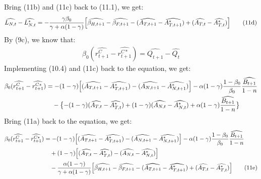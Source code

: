 \documentclass[a4paper,12pt]{article} %
\theoremstyle{nonitalic}
\begin{document}
Bring (11b) and (11c) back to (11.1), we get:
\begin{gather*}
    \widehat{L_{N,t}} - \widehat{L_{N,t}^*} = - \frac{\gamma \beta_0}{\gamma + \alpha(1-\gamma)} \Bigl[ \widehat{\beta_{H,t+1}} - \widehat{\beta_{F,t+1}} - (\widehat{A_{T,t+1}} - \widehat{A_{T,t+1}^*}) + (\widehat{A_{T,t}} - \widehat{A_{T,t}^*}) \Bigr] \tag{11d}
\end{gather*}
By (9c), we know that:
\begin{gather*}
    \beta_0 (\widehat{r_{t+1}^C} - \widehat{r_{t+1}^{C*}}) = \widehat{Q_{t+1}} - \widehat{Q_t}
\end{gather*}
Implementing (10.4) and (11c) back to the equation, we get:
\begin{align*}
    \beta_0 (\widehat{r_{t+1}^C} - \widehat{r_{t+1}^{C*}}) &= -(1-\gamma) \Bigl[ (\widehat{A_{T,t+1}} - \widehat{A_{T,t+1}^*}) - (\widehat{A_{N,t+1}} - \widehat{A_{N,t+1}^*}) \Bigr] - \alpha (1-\gamma) \frac{1-\beta_0}{\beta_0} \frac{\widehat{B_{t+1}}}{1-n} \\
    & \quad - \bigl\{ -(1-\gamma) (\widehat{A_{T,t}} - \widehat{A_{T,t}^*}) + (1-\gamma) (\widehat{A_{N,t}} - \widehat{A_{N,t}^*}) + \alpha (1-\gamma) \frac{\widehat{B_{t+1}}}{1-n} \bigr\}
\end{align*}
Bring (11a) back to the equation, we get:
\begin{align*}
    \beta_0 (\widehat{r_{t+1}^C} - \widehat{r_{t+1}^{C*}}) &= -(1-\gamma) \Bigl[ (\widehat{A_{T,t+1}} - \widehat{A_{T,t+1}^*}) - (\widehat{A_{N,t+1}} - \widehat{A_{N,t+1}^*}) \Bigr] - \alpha (1-\gamma) \frac{1-\beta_0}{\beta_0} \frac{\widehat{B_{t+1}}}{1-n} \\
    & \quad + (1-\gamma) \Bigl[(\widehat{A_{T,t}} - \widehat{A_{T,t}^*}) - (\widehat{A_{N,t}} - \widehat{A_{N,t}^*}) \Bigr] \\
    & \quad - \frac{\alpha (1-\gamma)}{\gamma + \alpha(1-\gamma)} \Bigl[ \widehat{\beta_{H,t+1}} - \widehat{\beta_{F,t+1}} - (\widehat{A_{T,t+1}} - \widehat{A_{T,t+1}^*}) + (\widehat{A_{T,t}} - \widehat{A_{T,t}^*}) \Bigr] \tag{11e}
\end{align*}
\end{document}
